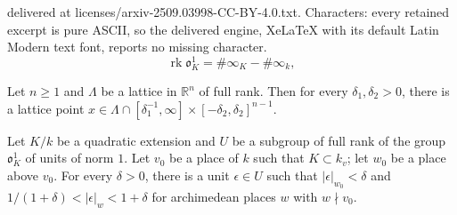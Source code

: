 \documentclass[10pt,a4paper]{amsart}
\DeclareMathOperator{\rk}{rk}
\newcommand{\RR}{\mathbb{R}}
\newcommand{\fo}{\mathfrak{o}}
\begin{document}
delivered at licenses/arxiv-2509.03998-CC-BY-4.0.txt. Characters: every retained excerpt is pure ASCII, so the delivered engine, XeLaTeX with its default Latin Modern text font, reports no missing character.
	\begin{equation}\label{eq:norm-1-rank}
		\rk\fo_K^1=\#\infty_K - \#\infty_k,
	\end{equation}

\begin{lemma}\label{lem:geom-numbers}
	Let $n\ge 1$ and $\Lambda$ be a lattice in $\RR^n$ of full rank. Then for every $\delta_1,\delta_2>0$, there is a lattice point $x\in \Lambda \cap [\delta_1^{-1},\infty]\times [-\delta_2,\delta_2]^{n-1}$.
\end{lemma}

\begin{lemma}\label{lem:units-of-norm-1}
	Let $K/k$ be a quadratic extension and $U$ be a subgroup of full rank of the group $\fo_K^1$ of units of norm $1$. Let $v_0$ be a place of $k$ such that $K\subset k_v$; let $w_0$ be a place above $v_0$. For every $\delta>0$, there is a unit $\epsilon\in U$ such that $|\epsilon|_{w_0}<\delta$ and $1/(1+ \delta) < |\epsilon|_{w} < 1+\delta$ for archimedean places $w$ with $w\nmid v_0$.
\end{lemma}
\end{document}
